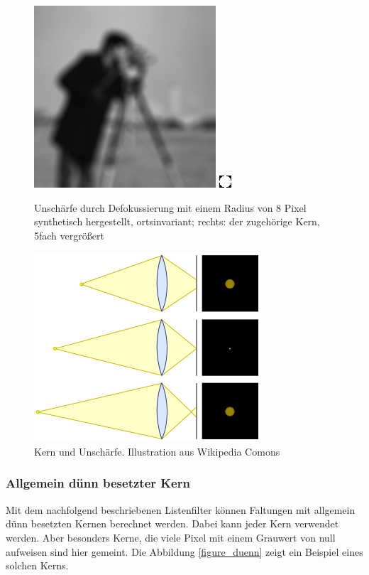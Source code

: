 \documentclass[a4paper,12pt]{article}
\begin{document}
\begin{figure}[htbp]
\centering
\includegraphics[scale=0.8]{lensblur17.png}
\includegraphics[scale=5]{kern_lensblur17.png}
\caption{Unschärfe durch Defokussierung mit einem Radius von 8 Pixel
synthetisch hergestellt, ortsinvariant; rechts: der zugehörige Kern, 5fach
vergrößert}%
\label{figure_lensblur}
\end{figure}

\begin{figure}[htbp]
\centering
\includegraphics[scale=0.5]{Cirles_of_confusion_lens_diagram.png}%
\caption{Kern und Unschärfe. Illustration aus Wikipedia Comons
\cite{circleofconfusion}}%
\label{figure_confusion}
\end{figure}

\subsubsection{Allgemein dünn besetzter Kern}
Mit dem nachfolgend beschriebenen Listenfilter können Faltungen mit allgemein
dünn besetzten Kernen berechnet werden. Dabei kann jeder Kern verwendet werden.
Aber besonders Kerne, die viele Pixel mit einem Grauwert von null aufweisen
sind hier gemeint. Die Abbildung \ref{figure_duenn} zeigt ein Beispiel eines
solchen Kerns.
\end{document}
